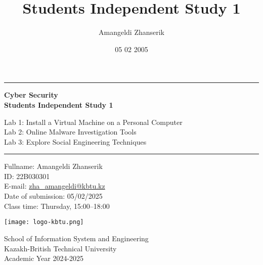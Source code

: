 \documentclass{article}
\title{Students Independent Study 1}
\author{Amangeldi Zhanserik}
\date{05 02 2005}
\begin{document}
\begin{titlepage}
    \centering

    \vspace*{1cm}

    \rule{\textwidth}{1pt}

    \vspace{.7\baselineskip}

    {\huge \textbf{Cyber Security \\ Students Independent Study 1}}

    \vspace*{.5cm}
    {
        Lab 1: Install a Virtual Machine on a Personal Computer \\
        Lab 2: Online Malware Investigation Tools \\
        Lab 3: Explore Social Engineering Techniques \\
    }
    
    \rule{\textwidth}{1pt}

    \vspace{1cm}

    \large

    \begin{flushleft}
        \begin{minipage}{.8\textwidth}
            \raggedright
            Fullname: Amangeldi Zhanserik \\
            ID: 22B030301 \\
            E-mail: {\normalsize \url{zha_amangeldi@kbtu.kz}} \\
            Date of submission: 05/02/2025 \\
            Class time: Thursday, 15:00--18:00 \\
        \end{minipage}%
    \end{flushleft}

    \vspace{2cm}

    \texttt{[image: logo-kbtu.png]}

    \vfill

    School of Information System and Engineering \\
    Kazakh-British Technical University \\
    Academic Year 2024-2025 \\
\end{titlepage}
\end{document}

